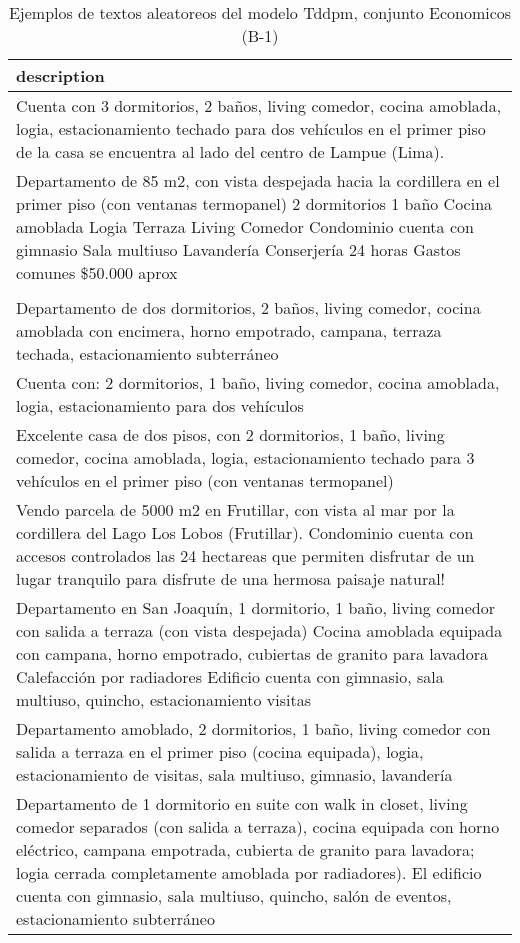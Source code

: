 \begin{table}[H]
\centering
\fontsize{8}{14}\selectfont
\caption{Ejemplos de textos aleatoreos del modelo Tddpm, conjunto Economicos (B-1)}
\label{table-sample10-economicos-b-1-tddpm_mlp-text}
\begin{tabular}{|m{50em}|}
\hline
\rowcolor[gray]{0.8}
description \\
\hline Cuenta con 3 dormitorios, 2 baños, living comedor, cocina amoblada, logia, estacionamiento techado para dos vehículos en el primer piso de la casa se encuentra al lado del centro de Lampue (Lima). \\
\hline Departamento de 85 m2, con vista despejada hacia la cordillera en el primer piso (con ventanas termopanel) 2 dormitorios 1 baño Cocina amoblada Logia Terraza Living Comedor Condominio cuenta con gimnasio Sala multiuso Lavandería Conserjería 24 horas Gastos comunes \$50.000 aprox \\
\hline  \\
\hline Departamento de dos dormitorios, 2 baños, living comedor, cocina amoblada con encimera, horno empotrado, campana, terraza techada, estacionamiento subterráneo \\
\hline Cuenta con: 2 dormitorios, 1 baño, living comedor, cocina amoblada, logia, estacionamiento para dos vehículos \\
\hline Excelente casa de dos pisos, con 2 dormitorios, 1 baño, living comedor, cocina amoblada, logia, estacionamiento techado para 3 vehículos en el primer piso (con ventanas termopanel) \\
\hline Vendo parcela de 5000 m2 en Frutillar, con vista al mar por la cordillera del Lago Los Lobos (Frutillar). Condominio cuenta con accesos controlados las 24 hectareas que permiten disfrutar de un lugar tranquilo para disfrute de una hermosa paisaje natural! \\
\hline Departamento en San Joaquín, 1 dormitorio, 1 baño, living comedor con salida a terraza (con vista despejada) Cocina amoblada equipada con campana, horno empotrado, cubiertas de granito para lavadora Calefacción por radiadores Edificio cuenta con gimnasio, sala multiuso, quincho, estacionamiento visitas \\
\hline Departamento amoblado, 2 dormitorios, 1 baño, living comedor con salida a terraza en el primer piso (cocina equipada), logia, estacionamiento de visitas, sala multiuso, gimnasio, lavandería \\
\hline Departamento de 1 dormitorio en suite con walk in closet, living comedor separados (con salida a terraza), cocina equipada con horno eléctrico, campana empotrada, cubierta de granito para lavadora; logia cerrada completamente amoblada por radiadores). El edificio cuenta con gimnasio, sala multiuso, quincho, salón de eventos, estacionamiento subterráneo \\
\hline
\end{tabular}
\end{table}
